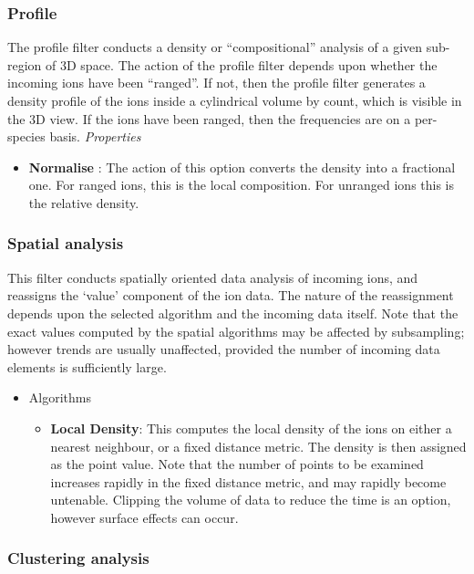 \documentclass[10pt]{article}
\begin{document}
\subsubsection{Profile}
 
The profile filter conducts a density or ``compositional'' analysis of a given sub-region of 3D space. The action of the profile filter depends upon whether the incoming ions have been ``ranged''. If not, then the profile filter generates a density profile of the ions inside a cylindrical volume by count, which is visible in the 3D view. If the ions have been ranged, then the frequencies are on a per-species basis. \emph{Properties}
\begin{itemize}
\item \textbf{Normalise} : The action of this option converts the density into a fractional one. For ranged ions, this is the local composition. For unranged ions this is the relative density.

\end{itemize}
\subsubsection{Spatial analysis}
 
 
 This filter conducts spatially oriented data analysis of incoming ions, and reassigns the `value' component of the ion data. The nature of the reassignment depends upon the selected algorithm and the incoming data itself. Note that the exact values computed by the spatial algorithms may be affected by subsampling; however trends are usually unaffected, provided the number of incoming data elements is sufficiently large. 
\begin{itemize}
 
\item  Algorithms 
\begin{itemize}
\item \textbf{Local Density}: This computes the local density of the ions on either a nearest neighbour, or a fixed distance metric. The density is then assigned as the point value. Note that the number of points to be examined increases rapidly in the fixed distance metric, and may rapidly become untenable. Clipping the volume of data to reduce the time is an option, however surface effects can occur.
\end{itemize}

\end{itemize}


\subsubsection{Clustering analysis}
\end{document}
